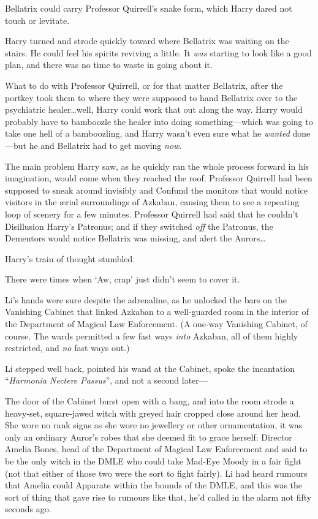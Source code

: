Bellatrix could carry Professor Quirrell’s snake form, which Harry dared not touch or levitate.

Harry turned and strode quickly toward where Bellatrix was waiting on the stairs. He could feel his spirits reviving a little. It \emph{was} starting to look like a good plan, and there was no time to waste in going about it.

What to do with Professor Quirrell, or for that matter Bellatrix, after the portkey took them to where they were supposed to hand Bellatrix over to the psychiatric healer…well, Harry could work that out along the way. Harry would probably have to bamboozle the healer into doing something—which was going to take one hell of a bamboozling, and Harry wasn’t even sure what he \emph{wanted} done—but he and Bellatrix had to get moving \emph{now}.

The main problem Harry saw, as he quickly ran the whole process forward in his imagination, would come when they reached the roof. Professor Quirrell had been supposed to sneak around invisibly and Confund the monitors that would notice visitors in the ærial surroundings of Azkaban, causing them to see a repeating loop of scenery for a few minutes. Professor Quirrell had said that he couldn’t Disillusion Harry’s Patronus; and if they switched \emph{off} the Patronus, the Dementors would notice Bellatrix was missing, and alert the Aurors…

Harry’s train of thought stumbled.

There were times when ‘Aw, crap’ just didn’t seem to cover it.

\later

Li’s hands were sure despite the adrenaline, as he unlocked the bars on the Vanishing Cabinet that linked Azkaban to a well-guarded room in the interior of the Department of Magical Law Enforcement. (A one-way Vanishing Cabinet, of course. The wards permitted a few fast ways \emph{into} Azkaban, all of them highly restricted, and \emph{no} fast ways out.)

Li stepped well back, pointed his wand at the Cabinet, spoke the incantation “\emph{Harmonia Nectere Passus}”, and not a second later—

The door of the Cabinet burst open with a bang, and into the room strode a heavy-set, square-jawed witch with greyed hair cropped close around her head. She wore no rank signs as she wore no jewellery or other ornamentation, it was only an ordinary Auror’s robes that she deemed fit to grace herself: Director Amelia Bones, head of the Department of Magical Law Enforcement and said to be the only witch in the DMLE who could take Mad-Eye Moody in a fair fight (not that either of those two were the sort to fight fairly). Li had heard rumours that Amelia could Apparate within the bounds of the DMLE, and this was the sort of thing that gave rise to rumours like that, he’d called in the alarm not fifty seconds ago.

